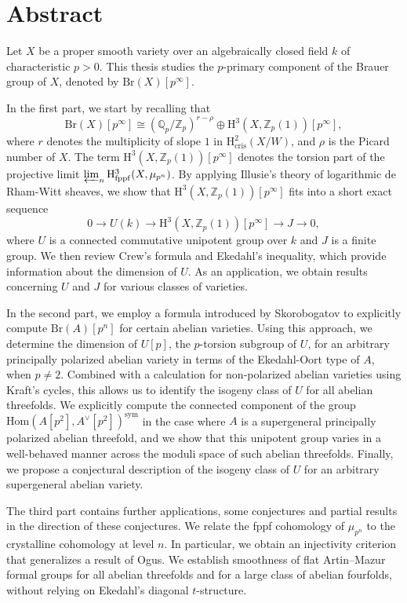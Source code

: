 \documentclass[a4paper,12pt,twoside]{report}
\newcommand{\Q}{\mathbb{Q}}
\newcommand{\Z}{\mathbb{Z}}
\newcommand{\cris}{\mathrm{cris}}
\newcommand{\fppf}{\mathrm{fppf}}
\newcommand{\Br}{\mathrm{Br}}
\newcommand{\HH}{\mathrm{H}}
\newcommand{\Hom}{\mathrm{Hom}}
\newcommand{\sym}{\mathrm{sym}}
\begin{document}
\chapter*{Abstract}

Let $X$ be a proper smooth variety over an algebraically closed field $k$ of characteristic $p>0$. 
This thesis studies the 
$p$-primary component of the Brauer group of $X$, denoted by $\Br(X)[p^\infty]$. 

In the first part, we start by recalling
that \[\Br(X)[p^\infty]\cong (\Q_p/\Z_p)^{r-\rho}\oplus \HH^3(X,\Z_p(1))[p^\infty],\] 
where $r$ denotes the multiplicity of slope $1$ in $\HH^2_{\cris}(X/W)$, and $\rho$ is the Picard number of $X$.  
The term $\HH^3(X,\Z_p(1))[p^\infty]$ denotes the torsion part of the projective limit $\varprojlim_{n}\HH^3_{\fppf}(X,\mu_{p^n})$. 
By applying Illusie's theory of logarithmic de Rham-Witt sheaves, we show that
$\HH^3(X,\Z_p(1))[p^\infty]$ fits into a short exact sequence
\[0\rightarrow U(k)\rightarrow \HH^3(X,\Z_p(1))[p^\infty]\rightarrow J\rightarrow 0,\]
where $U$ is a connected commutative unipotent group over $k$ and $J$ is a finite group. 
We then review Crew's formula and Ekedahl's inequality, 
which provide information about the 
dimension of $U$. 
As an application, we obtain results concerning $U$ and $J$ for various classes of varieties. 

In the second part, we employ a formula introduced by Skorobogatov 
to explicitly compute $\Br(A)[p^n]$ for certain abelian varieties. 
Using this approach, we determine the dimension of $U[p]$, the $p$-torsion subgroup of $U$, for 
an arbitrary principally polarized abelian variety in terms of the Ekedahl-Oort type of $A$, when $p\neq 2$. 
Combined with a calculation for non-polarized abelian varieties using Kraft's cycles, 
this allows us to identify the isogeny class of $U$ for all abelian threefolds. 
We explicitly compute the connected component of the group $\Hom(A[p^2],A^\vee[p^2])^{\sym}$ in the case where
$A$ is a supergeneral principally polarized abelian threefold, 
and we show that this unipotent group varies in a well-behaved manner across the moduli space of such abelian threefolds. 
Finally, we propose a conjectural description of the isogeny class of $U$
for an arbitrary supergeneral abelian variety. 

The third part contains further applications, some conjectures and partial results in the direction
of these conjectures.
We relate the fppf cohomology of $\mu_{p^n}$ to the crystalline cohomology at level $n$.
In particular, we obtain an injectivity criterion that generalizes a result of Ogus.
We establish smoothness of flat Artin--Mazur formal groups for all abelian threefolds 
and for a large class of abelian fourfolds, 
without relying on Ekedahl's diagonal $t$-structure. 
\end{document}
